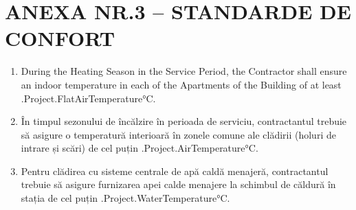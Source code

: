 \section{ANEXA NR.3 – STANDARDE DE CONFORT}

\begin{enumerate}
	\item During the Heating Season in the Service Period, the Contractor shall ensure an indoor temperature in each of the Apartments of the Building of at least \iffalse input project.flat_airtemp value="{{.Project.FlatAirTemperature}}" \fi {{.Project.FlatAirTemperature}}°C.

	\item În timpul sezonului de încălzire în perioada de serviciu, contractantul trebuie să asigure o temperatură interioară în zonele comune ale clădirii (holuri de intrare și scări) de cel puțin \iffalse input project.airtemp value="{{.Project.AirTemperature}}" \fi {{.Project.AirTemperature}}°C.

	\item Pentru clădirea cu sisteme centrale de apă caldă menajeră, contractantul trebuie să asigure furnizarea apei calde menajere la schimbul de căldură în stația de cel puțin \iffalse input project.watertemp value="{{.Project.WaterTemperature}}" \fi {{.Project.WaterTemperature}}°C.
\end{enumerate}
